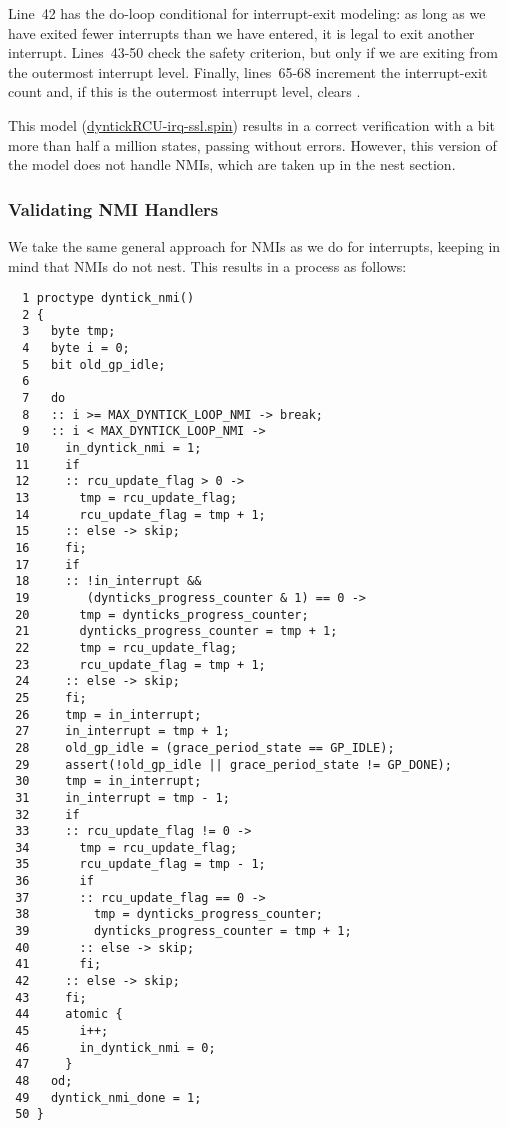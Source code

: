 Line~42 has the do-loop conditional for interrupt-exit modeling:
as long as we have exited fewer interrupts than we have entered, it is
legal to exit another interrupt.
Lines~43-50 check the safety criterion, but only if we are exiting
from the outermost interrupt level.
Finally, lines~65-68 increment the interrupt-exit count 
and, if this is the outermost interrupt level, clears
.

This model (\url{dyntickRCU-irq-ssl.spin})
results in a correct verification with a bit more than half a million
states, passing without errors.
However, this version of the model does not handle NMIs,
which are taken up in the nest section.

\subsubsection{Validating NMI Handlers}
\label{app:formal:Validating NMI Handlers}

We take the same general approach for NMIs as we do for interrupts,
keeping in mind that NMIs do not nest.
This results in a  process as follows:

{ \scriptsize
\begin{verbatim}
  1 proctype dyntick_nmi()
  2 {
  3   byte tmp;
  4   byte i = 0;
  5   bit old_gp_idle;
  6
  7   do
  8   :: i >= MAX_DYNTICK_LOOP_NMI -> break;
  9   :: i < MAX_DYNTICK_LOOP_NMI ->
 10     in_dyntick_nmi = 1;
 11     if
 12     :: rcu_update_flag > 0 ->
 13       tmp = rcu_update_flag;
 14       rcu_update_flag = tmp + 1;
 15     :: else -> skip;
 16     fi;
 17     if
 18     :: !in_interrupt &&
 19        (dynticks_progress_counter & 1) == 0 ->
 20       tmp = dynticks_progress_counter;
 21       dynticks_progress_counter = tmp + 1;
 22       tmp = rcu_update_flag;
 23       rcu_update_flag = tmp + 1;
 24     :: else -> skip;
 25     fi;
 26     tmp = in_interrupt;
 27     in_interrupt = tmp + 1;
 28     old_gp_idle = (grace_period_state == GP_IDLE);
 29     assert(!old_gp_idle || grace_period_state != GP_DONE);
 30     tmp = in_interrupt;
 31     in_interrupt = tmp - 1;
 32     if
 33     :: rcu_update_flag != 0 ->
 34       tmp = rcu_update_flag;
 35       rcu_update_flag = tmp - 1;
 36       if
 37       :: rcu_update_flag == 0 ->
 38         tmp = dynticks_progress_counter;
 39         dynticks_progress_counter = tmp + 1;
 40       :: else -> skip;
 41       fi;
 42     :: else -> skip;
 43     fi;
 44     atomic {
 45       i++;
 46       in_dyntick_nmi = 0;
 47     }
 48   od;
 49   dyntick_nmi_done = 1;
 50 }
\end{verbatim}
}


